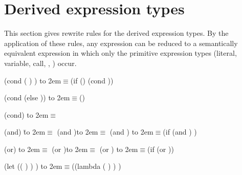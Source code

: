 \section{Derived expression types}
\label{derivedsection}

This section gives rewrite rules for the derived expression types.  By
the application of these rules, any expression can be reduced to a
semantically equivalent expression in which only the primitive
expression types (literal, variable, call, , ) occur.

\newcommand{\iet}{\hbox to 2em{\hfil $\equiv$}}  %

\begin{schemenoindent}
(cond ( )
       \dotsfoo)
\iet  (if 
          ()
          (cond  \dotsfoo))

(cond (else ))
\iet  ()

(cond)
\iet  {}
\end{schemenoindent}

\begin{schemenoindent}
(and)         \=\iet  \schtrue
(and )\>\iet  {}
(and   \dotsfoo)
\iet  (if  (and  \dotsfoo) \schfalse{})

(or)          \>\iet  \schfalse
(or )\>\iet  {}
(or   \dotsfoo)
\iet  (if   (or  \dotsfoo))

(let (( ) \dotsfoo)
  )
\iet  ((lambda ( \dotsfoo) )  \dotsfoo)
\end{schemenoindent}

